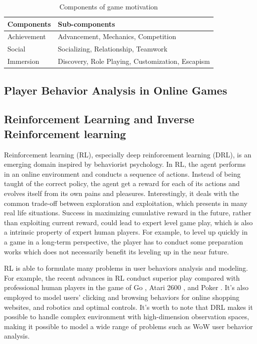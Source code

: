 \documentclass{sigchi}
\begin{document}
\begin{table}
\caption{Components of game motivation}
\begin{tabularx}{\textwidth}{lX}
    Components & Sub-components \\
    \midrule
    Achievement & Advancement, Mechanics, Competition \\
    Social & Socializing, Relationship, Teamwork \\
    Immersion & Discovery, Role Playing, Customization, Escapism
    \label{tbl:components}
\end{tabularx}
\end{table}

\subsection{Player Behavior Analysis in Online Games}



\subsection{Reinforcement Learning and Inverse Reinforcement learning}

Reinforcement learning (RL), especially deep reinforcement learning (DRL), is an emerging domain inspired by behaviorist psychology. 
In RL, the agent performs in an online environment and conducts a sequence of actions.
Instead of being taught of the correct policy, the agent get a reward for each of its actions and evolves itself from its own pains and pleasures. 
Interestingly, it deals with the common trade-off between exploration and exploitation, which presents in many real life situations. 
Success in maximizing cumulative reward in the future, rather than exploiting current reward, could lead to expert level game play, which is also a intrinsic property of expert human players.
For example, to level up quickly in a game in a long-term perspective, the player has to conduct some preparation works which does not necessarily benefit its leveling up in the near future.

RL is able to formulate many problems in user behaviors analysis and modeling. 
For example, the recent advances in RL conduct superior play compared with professional human players in the game of Go \cite{silver2016mastering}, Atari 2600 \cite{mnih2015human}, and Poker \cite{heinrich2016deep}. 
It's also employed to model users' clicking and browsing behaviors for online shopping websites, and robotics and optimal controls.  It's worth to note that DRL makes it possible to handle complex environment with high-dimension observation spaces, making it possible to model a wide range of problems such as WoW user behavior analysis.
\end{document}
